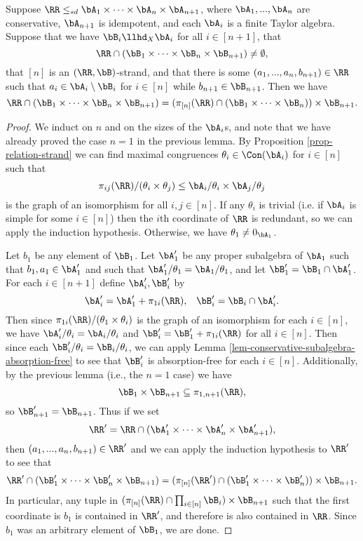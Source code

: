 \begin{lem} Suppose $\RR \le_{sd} \bA_1 \times \cdots \times \bA_n \times \bA_{n+1}$, where $\bA_1, ..., \bA_n$ are conservative, $\bA_{n+1}$ is idempotent, and each $\bA_i$ is a finite Taylor algebra. Suppose that we have $\bB_i \llhd_X \bA_i$ for all $i \in [n+1]$, that
\[
\RR \cap (\bB_1 \times \cdots \times \bB_n \times \bB_{n+1}) \ne \emptyset,
\]
that $[n]$ is an $(\RR,\bB)$-strand, and that there is some $(a_1, ..., a_n, b_{n+1}) \in \RR$ such that $a_i \in \bA_i\setminus \bB_i$ for $i \in [n]$ while $b_{n+1} \in \bB_{n+1}$. Then we have
\[
\RR \cap (\bB_1 \times \cdots \times \bB_n \times \bB_{n+1}) = (\pi_{[n]}(\RR) \cap (\bB_1 \times \cdots \times \bB_n)) \times \bB_{n+1}.
\]
\end{lem}
\begin{proof} We induct on $n$ and on the sizes of the $\bA_i$s, and note that we have already proved the case $n=1$ in the previous lemma. By Proposition \ref{prop-relation-strand} we can find maximal congruences $\theta_i \in \Con(\bA_i)$ for $i \in [n]$ such that
\[
\pi_{ij}(\RR)/(\theta_i \times \theta_j) \le \bA_i/\theta_i \times \bA_j/\theta_j
\]
is the graph of an isomorphism for all $i,j \in [n]$. If any $\theta_i$ is trivial (i.e. if $\bA_i$ is simple for some $i \in [n]$) then the $i$th coordinate of $\RR$ is redundant, so we can apply the induction hypothesis. Otherwise, we have $\theta_1 \ne 0_{\bA_1}$.

Let $b_1$ be any element of $\bB_1$. Let $\bA_1'$ be any proper subalgebra of $\bA_1$ such that $b_1, a_1 \in \bA_1'$ and such that $\bA_1'/\theta_1 = \bA_1/\theta_1$, and let $\bB_1' = \bB_1 \cap \bA_1'$. For each $i \in [n+1]$ define $\bA_i', \bB_i'$ by
\[
\bA_i' = \bA_1' + \pi_{1i}(\RR), \;\;\; \bB_i' = \bB_i \cap \bA_i'.
\]
Then since $\pi_{1i}(\RR)/(\theta_1 \times \theta_i)$ is the graph of an isomorphism for each $i \in [n]$, we have $\bA_i'/\theta_i = \bA_i/\theta_i$ and $\bB_i' = \bB_1' + \pi_{1i}(\RR)$ for all $i \in [n]$. Then since each $\bB_i'/\theta_i = \bB_i/\theta_i$, we can apply Lemma \ref{lem-conservative-subalgebra-absorption-free} to see that $\bB_i'$ is absorption-free for each $i \in [n]$. Additionally, by the previous lemma (i.e., the $n=1$ case) we have
\[
\bB_1 \times \bB_{n+1} \subseteq \pi_{1,n+1}(\RR),
\]
so $\bB_{n+1}' = \bB_{n+1}$. Thus if we set
\[
\RR' = \RR \cap (\bA_1' \times \cdots \times \bA_n' \times \bA_{n+1}'),
\]
then $(a_1, ..., a_n, b_{n+1}) \in \RR'$ and we can apply the induction hypothesis to $\RR'$ to see that
\[
\RR' \cap (\bB_1' \times \cdots \times \bB_n' \times \bB_{n+1}) = (\pi_{[n]}(\RR') \cap (\bB_1' \times \cdots \times \bB_n')) \times \bB_{n+1}.
\]
In particular, any tuple in $(\pi_{[n]}(\RR) \cap \prod_{i\in [n]} \bB_i) \times \bB_{n+1}$ such that the first coordinate is $b_1$ is contained in $\RR'$, and therefore is also contained in $\RR$. Since $b_1$ was an arbitrary element of $\bB_1$, we are done.
\end{proof}

